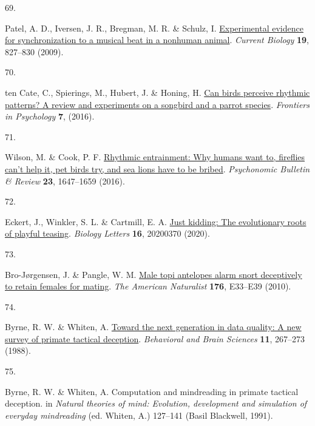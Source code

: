 \documentclass[
  man,floatsintext]{apa6}
\newlength{\cslhangindent}
\newlength{\csllabelwidth}
\newlength{\cslentryspacingunit} %
\newenvironment{CSLReferences}[2] %
 {%
  \setlength{\parindent}{0pt}
  \ifodd #1
  \let\oldpar\par
  \def\par{\hangindent=\cslhangindent\oldpar}
  \fi
  \setlength{\parskip}{#2\cslentryspacingunit}
 }%
 {}
\newcommand{\CSLLeftMargin}[1]{\parbox[t]{\csllabelwidth}{#1}}
\newcommand{\CSLRightInline}[1]{\parbox[t]{\linewidth - \csllabelwidth}{#1}\break}
\begin{document}
\begin{CSLReferences}{0}{0}
\leavevmode{}%
\CSLLeftMargin{69. }%
\CSLRightInline{Patel, A. D., Iversen, J. R., Bregman, M. R. \& Schulz, I. \href{https://doi.org/10.1016/j.cub.2009.03.038}{Experimental evidence for synchronization to a musical beat in a nonhuman animal}. \emph{Current Biology} \textbf{19}, 827--830 (2009).}

\leavevmode{}%
\CSLLeftMargin{70. }%
\CSLRightInline{ten Cate, C., Spierings, M., Hubert, J. \& Honing, H. \href{https://doi.org/10.3389/fpsyg.2016.00730}{Can birds perceive rhythmic patterns? A review and experiments on a songbird and a parrot species}. \emph{Frontiers in Psychology} \textbf{7}, (2016).}

\leavevmode{}%
\CSLLeftMargin{71. }%
\CSLRightInline{Wilson, M. \& Cook, P. F. \href{https://doi.org/10.3758/s13423-016-1013-x}{Rhythmic entrainment: Why humans want to, fireflies can't help it, pet birds try, and sea lions have to be bribed}. \emph{Psychonomic Bulletin \& Review} \textbf{23}, 1647--1659 (2016).}

\leavevmode{}%
\CSLLeftMargin{72. }%
\CSLRightInline{Eckert, J., Winkler, S. L. \& Cartmill, E. A. \href{https://doi.org/10.1098/rsbl.2020.0370}{Just kidding: The evolutionary roots of playful teasing}. \emph{Biology Letters} \textbf{16}, 20200370 (2020).}

\leavevmode{}%
\CSLLeftMargin{73. }%
\CSLRightInline{Bro-Jørgensen, J. \& Pangle, W. M. \href{https://doi.org/10.1086/653078}{Male topi antelopes alarm snort deceptively to retain females for mating}. \emph{The American Naturalist} \textbf{176}, E33--E39 (2010).}

\leavevmode{}%
\CSLLeftMargin{74. }%
\CSLRightInline{Byrne, R. W. \& Whiten, A. \href{https://doi.org/10.1017/S0140525X00049955}{Toward the next generation in data quality: A new survey of primate tactical deception}. \emph{Behavioral and Brain Sciences} \textbf{11}, 267--273 (1988).}

\leavevmode{}%
\CSLLeftMargin{75. }%
\CSLRightInline{Byrne, R. W. \& Whiten, A. Computation and mindreading in primate tactical deception. in \emph{Natural theories of mind: Evolution, development and simulation of everyday mindreading} (ed. Whiten, A.) 127--141 (Basil Blackwell, 1991).}


\end{CSLReferences}
\end{document}
